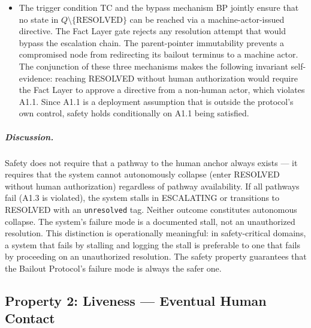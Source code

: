 \begin{itemize}
\item[\textbf{Step 3.}] The trigger condition TC and the bypass mechanism BP jointly ensure that no state in $Q \setminus \{\text{RESOLVED}\}$ can be reached via a machine-actor-issued directive. The Fact Layer gate rejects any resolution attempt that would bypass the escalation chain. The parent-pointer immutability prevents a compromised node from redirecting its bailout terminus to a machine actor. The conjunction of these three mechanisms makes the following invariant self-evidence: reaching RESOLVED without human authorization would require the Fact Layer to approve a directive from a non-human actor, which violates A1.1. Since A1.1 is a deployment assumption that is outside the protocol's own control, safety holds conditionally on A1.1 being satisfied.
\end{itemize}

\subparagraph{Discussion.} Safety does not require that a pathway to the human anchor always exists — it requires that the system cannot autonomously collapse (enter RESOLVED without human authorization) regardless of pathway availability. If all pathways fail (A1.3 is violated), the system stalls in ESCALATING or transitions to RESOLVED with an \texttt{unresolved} tag. Neither outcome constitutes autonomous collapse. The system's failure mode is a documented stall, not an unauthorized resolution. This distinction is operationally meaningful: in safety-critical domains, a system that fails by stalling and logging the stall is preferable to one that fails by proceeding on an unauthorized resolution. The safety property guarantees that the Bailout Protocol's failure mode is always the safer one.

\subsection{Property 2: Liveness — Eventual Human Contact}



